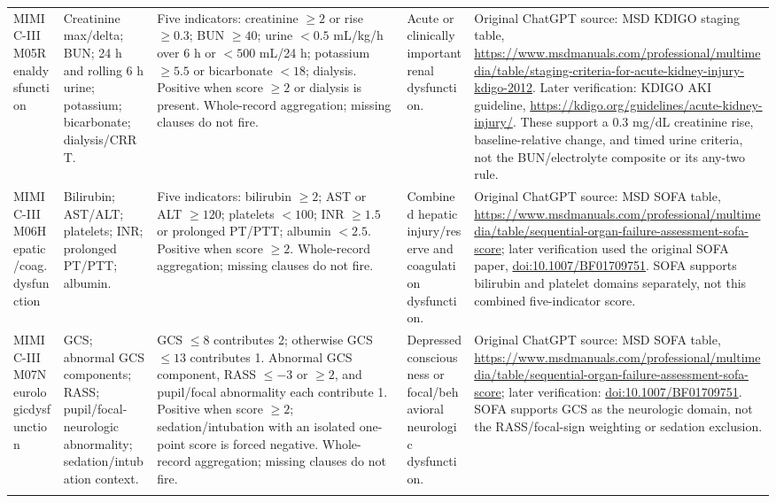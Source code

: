 \documentclass[letterpaper,10pt]{article}
\begin{document}
\begin{landscape}
\begin{longtable}{@{}L{0.88in}L{1.72in}L{2.32in}L{1.05in}L{2.82in}@{}}
MIMIC-III M05\newline Renal\newline dysfunction &
Creatinine max/delta; BUN; 24 h and rolling 6 h urine; potassium;
bicarbonate; dialysis/CRRT. &
Five indicators: creatinine $\geq2$ or rise $\geq0.3$; BUN $\geq40$;
urine $<0.5$ mL/kg/h over 6 h or $<500$ mL/24 h; potassium $\geq5.5$
or bicarbonate $<18$; dialysis. Positive when score $\geq2$ or dialysis is
present. Whole-record aggregation; missing clauses do not fire. &
Acute or clinically important renal dysfunction. &
Original ChatGPT source: MSD KDIGO staging table,
\url{https://www.msdmanuals.com/professional/multimedia/table/staging-criteria-for-acute-kidney-injury-kdigo-2012}.
Later verification: KDIGO AKI guideline,
\url{https://kdigo.org/guidelines/acute-kidney-injury/}. These support a
$0.3$ mg/dL creatinine rise, baseline-relative change, and timed urine
criteria, not the BUN/electrolyte composite or its any-two rule. \\
\addlinespace

MIMIC-III M06\newline Hepatic/coag.\newline dysfunction &
Bilirubin; AST/ALT; platelets; INR; prolonged PT/PTT; albumin. &
Five indicators: bilirubin $\geq2$; AST or ALT $\geq120$; platelets
$<100$; INR $\geq1.5$ or prolonged PT/PTT; albumin $<2.5$. Positive
when score $\geq2$. Whole-record aggregation; missing clauses do not fire. &
Combined hepatic injury/reserve and coagulation dysfunction. &
Original ChatGPT source: MSD SOFA table,
\url{https://www.msdmanuals.com/professional/multimedia/table/sequential-organ-failure-assessment-sofa-score};
later verification used the original SOFA paper,
\href{https://doi.org/10.1007/BF01709751}{doi:10.1007/BF01709751}.
SOFA supports bilirubin and platelet domains separately, not this combined
five-indicator score. \\
\addlinespace

MIMIC-III M07\newline Neurologic\newline dysfunction &
GCS; abnormal GCS components; RASS; pupil/focal-neurologic abnormality;
sedation/intubation context. &
GCS $\leq8$ contributes 2; otherwise GCS $\leq13$ contributes 1.
Abnormal GCS component, RASS $\leq-3$ or $\geq2$, and pupil/focal
abnormality each contribute 1. Positive when score $\geq2$;
sedation/intubation with an isolated one-point score is forced negative.
Whole-record aggregation; missing clauses do not fire. &
Depressed consciousness or focal/behavioral neurologic dysfunction. &
Original ChatGPT source: MSD SOFA table,
\url{https://www.msdmanuals.com/professional/multimedia/table/sequential-organ-failure-assessment-sofa-score};
later verification:
\href{https://doi.org/10.1007/BF01709751}{doi:10.1007/BF01709751}.
SOFA supports GCS as the neurologic domain, not the RASS/focal-sign weighting
or sedation exclusion. \\
\addlinespace


\end{longtable}
\end{landscape}
\end{document}
